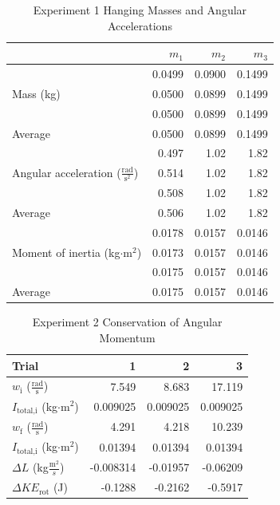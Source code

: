 \documentclass [12pt, letterpaper, twoside] {article}
\begin{document}
\begin {table}[h!]
  \centering
  \begin {tabular}{| l | r | r | r |}
    \hline\hline
    & \(m_{1}\) & \(m_{2}\) & \(m_{3}\) \\
    \hline
    \multirow{3}{*}{Mass (kg)} & 0.0499 & 0.0900 & 0.1499 \\
    & 0.0500 & 0.0899 & 0.1499 \\
    & 0.0500 & 0.0899 & 0.1499 \\
    \hline
    Average & 0.0500 & 0.0899 & 0.1499 \\ %
    \hline
    \multirow{3}{*}{Angular acceleration (\(\tfrac{\text{rad}}{\text{s}^2}\))} & 0.497 & 1.02 & 1.82 \\
    & 0.514 & 1.02 & 1.82 \\
    & 0.508 & 1.02 & 1.82 \\
    \hline
    Average & 0.506 & 1.02 & 1.82 \\ %
    \hline
    \multirow{3}{*}{Moment of inertia (kg\(\cdot\text{m}^2\))} & 0.0178 & 0.0157 & 0.0146 \\ %
    & 0.0173 & 0.0157 & 0.0146 \\ %
    & 0.0175 & 0.0157 & 0.0146 \\ %
    \hline
    Average & 0.0175 & 0.0157 & 0.0146 \\ %
    \hline\hline
  \end {tabular}
  \caption {Experiment 1 Hanging Masses and Angular Accelerations}
\end {table}

\begin {table}[h!]
  \centering
  \begin {tabular} {| l | r | r | r |}
    \hline\hline
    Trial & 1 & 2 & 3 \\
    \hline
    \(w_{\text{i}}\) (\(\tfrac{\text{rad}}{\text{s}}\)) & 7.549 & 8.683 & 17.119 \\
    \hline
    \(I_{\text{total,i}}\) (kg\(\cdot{\text{m}^2}\)) & 0.009025 & 0.009025 & 0.009025 \\ %
    \hline
    \(w_{\text{f}}\) (\(\tfrac{\text{rad}}{\text{s}}\)) & 4.291 & 4.218 & 10.239 \\
    \hline
    \(I_{\text{total,i}}\) (kg\(\cdot{\text{m}^2}\)) & 0.01394 & 0.01394 & 0.01394 \\ %
    \hline
    \(\Delta{L}\) (kg\(\tfrac{\text{m}^2}{s}\)) & -0.008314 & -0.01957 & -0.06209 \\ %
    \hline
    \(\Delta{KE}_{\text{rot}}\) (J) & -0.1288 & -0.2162 & -0.5917 \\ %
    \hline\hline
  \end {tabular}
  \caption{Experiment 2 Conservation of Angular Momentum}
\end {table}
\end{document}
